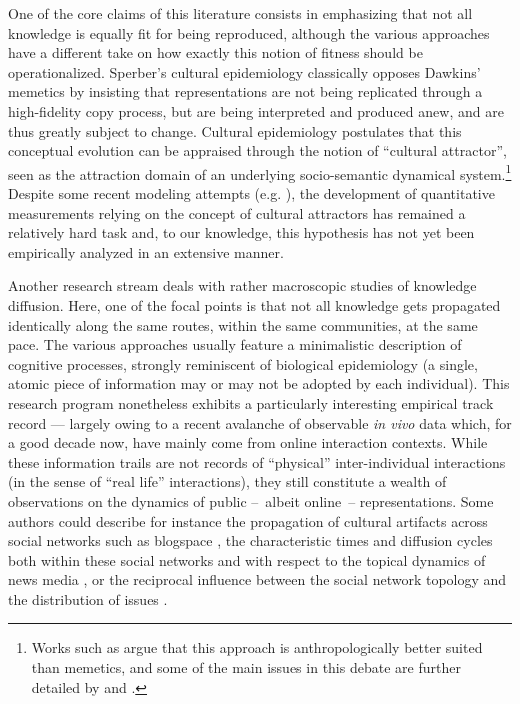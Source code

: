 One of the core claims of this literature consists in emphasizing that not all knowledge is equally fit for being reproduced, although the various approaches have a different take on how exactly this notion of fitness should be operationalized. Sperber's cultural epidemiology classically opposes Dawkins' memetics by insisting that representations are not being replicated through a high-fidelity copy process, but are being interpreted and produced anew, and are thus greatly subject to change.
Cultural epidemiology postulates that this conceptual evolution can be appraised through the notion of ``cultural attractor'', seen as the attraction domain of an underlying socio-semantic dynamical system.\footnote{Works such as \citet{Atran03} argue that this approach is anthropologically better suited than memetics, and some of the main issues in this debate are further detailed by \citet{Kuper00} and \citet{Bloch00}.}
Despite some recent modeling attempts (\hbox{e.g.} \citet{Claidiere07}), the development of quantitative measurements relying on the concept of cultural attractors has remained a relatively hard task and, to our knowledge, this hypothesis has not yet been empirically analyzed in an extensive manner.


Another research stream deals with rather macroscopic studies of knowledge diffusion. Here, one of the focal points is that not all knowledge gets propagated identically along the same routes, within the same communities, at the same pace. The various approaches usually feature a minimalistic description of cognitive processes, strongly reminiscent of biological epidemiology (a single, atomic piece of information may or may not be adopted by each individual).  
This research program nonetheless exhibits a particularly interesting empirical track record --- largely owing to a recent avalanche of observable \emph{in vivo} data which, for a good decade now, have mainly come from online interaction contexts.
While these information trails are not records of ``physical'' inter-individual interactions (in the sense of ``real life'' interactions), they still constitute a wealth of observations on the dynamics of public --~albeit online~-- representations.
Some authors could describe for instance the propagation of cultural artifacts across social networks such as blogspace \citep{Gruhl04}, the characteristic times and diffusion cycles both within these social networks and with respect to the topical dynamics of news media \citep{Leskovec09}, or the reciprocal influence between the social network topology and the distribution of issues \citep{Cointet09}.

